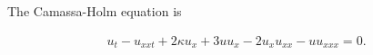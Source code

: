 The Camassa-Holm equation is

\begin{align}
u_{t} - u_{xxt} + 2\kappa u_{x} + 3uu_{x} - 2u_{x}u_{xx} - uu_{xxx} = 0.
\end{align}